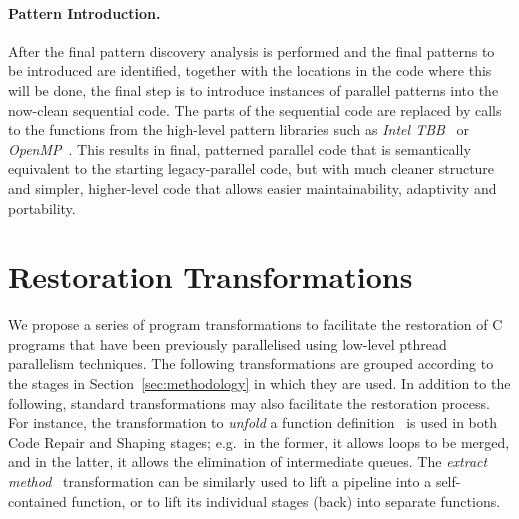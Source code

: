 \paragraph{Pattern Introduction.}
After the final pattern discovery analysis is performed and the final patterns to be introduced are identified, together with the locations in the code where this will be done, the final step is to introduce instances of parallel patterns into the now-clean sequential code.
The parts of the sequential code are replaced by calls to the functions from the high-level pattern libraries such as \emph{Intel TBB}~\cite{DBLP:reference/parallel/X11pz} or \emph{OpenMP}~\cite{10.1109/99.660313}.
This results in final, patterned parallel code that is semantically equivalent to the starting legacy-parallel code, but with much cleaner structure and simpler, higher-level code that allows easier maintainability, adaptivity and portability.

\section{Restoration Transformations} \label{sec:refactoring}

We propose a series of program transformations to facilitate the restoration of C programs that have been previously parallelised using low-level pthread parallelism techniques. The following transformations are grouped according to the stages in Section~\ref{sec:methodology} in which they are used.
%
In addition to the following, standard transformations may also facilitate the restoration process. For instance, the transformation to \emph{unfold} a function definition~\cite{darlington77} is used in both Code Repair and Shaping stages; e.g.\ in the former, it allows loops to be merged, and in the latter, it allows the elimination of intermediate queues. The \emph{extract method}~\cite{DBLP:books/daglib/0019908} transformation can be similarly used to lift a pipeline into a self-contained function, or to lift its individual stages (back) into separate functions.


